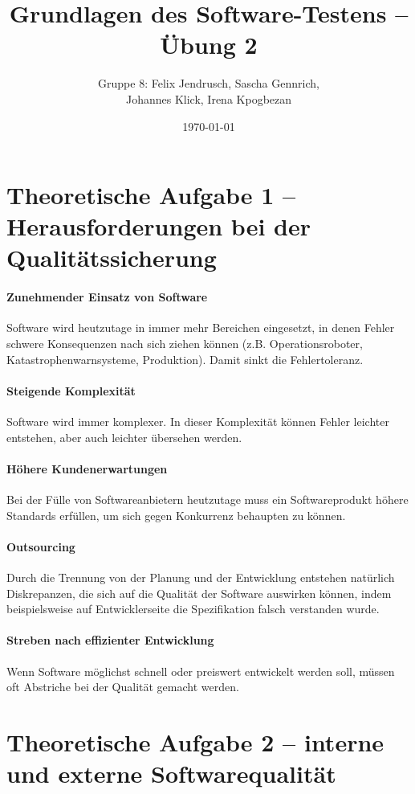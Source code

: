 \documentclass[a4paper, 12pt]{article}
\title{Grundlagen des Software-Testens -- Übung 2}
\author{Gruppe 8: Felix Jendrusch, Sascha Gennrich, \\Johannes Klick, Irena Kpogbezan}
\date{\today}
\begin{document}
\maketitle

\section*{Theoretische Aufgabe 1 -- Herausforderungen bei der Qualitätssicherung}

\paragraph{Zunehmender Einsatz von Software} Software wird heutzutage in immer mehr Bereichen eingesetzt, in denen Fehler schwere Konsequenzen nach sich ziehen können (z.B. Operationsroboter, Katastrophenwarnsysteme, Produktion). Damit sinkt die Fehlertoleranz.
\paragraph{Steigende Komplexität} Software wird immer komplexer. In dieser Komplexität können Fehler leichter entstehen, aber auch leichter übersehen werden.
\paragraph{Höhere Kundenerwartungen} Bei der Fülle von Softwareanbietern heutzutage muss ein Softwareprodukt höhere Standards erfüllen, um sich gegen Konkurrenz behaupten zu können.
\paragraph{Outsourcing} Durch die Trennung von der Planung und der Entwicklung entstehen natürlich Diskrepanzen, die sich auf die Qualität der Software auswirken können, indem beispielsweise auf Entwicklerseite die Spezifikation falsch verstanden wurde.
\paragraph{Streben nach effizienter Entwicklung} Wenn Software möglichst schnell oder preiswert entwickelt werden soll, müssen oft Abstriche bei der Qualität gemacht werden.
\paragraph{}

\newpage

\section*{Theoretische Aufgabe 2 -- interne und externe Softwarequalität}
\end{document}

